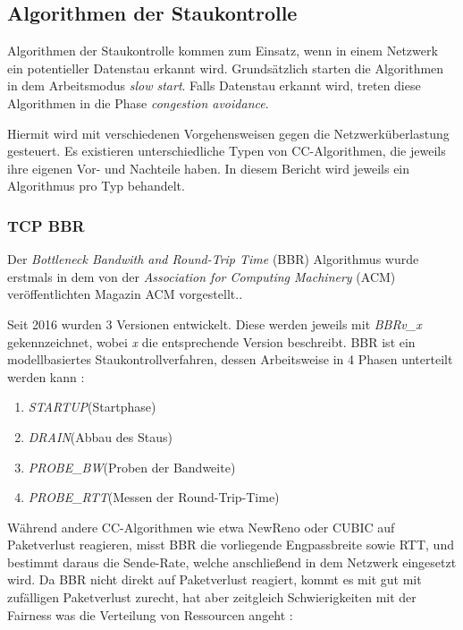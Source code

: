 \documentclass[paper=a4,fontsize=12pt,ngerman]{scrartcl}
\begin{document}
\subsection{Algorithmen der Staukontrolle }

Algorithmen der Staukontrolle kommen zum Einsatz, wenn in einem Netzwerk ein potentieller Datenstau erkannt wird.
Grundsätzlich starten die Algorithmen in dem Arbeitsmodus \textit{slow start}.
Falls Datenstau erkannt wird, treten diese Algorithmen in die Phase \textit{congestion avoidance}.


Hiermit wird mit verschiedenen Vorgehensweisen gegen die Netzwerküberlastung gesteuert. 
\newline
Es existieren unterschiedliche Typen von CC-Algorithmen, die jeweils ihre eigenen Vor- und Nachteile haben.
In diesem Bericht wird jeweils ein Algorithmus pro Typ behandelt.





\subsubsection{TCP BBR} 
Der \textit{Bottleneck Bandwith and Round-Trip Time} (BBR) Algorithmus wurde erstmals in dem von der
\textit{Association for Computing Machinery} (ACM) veröffentlichten Magazin ACM vorgestellt.\cite{cardwell2016bbr}. 

Seit 2016 wurden 3 Versionen entwickelt. Diese werden jeweils mit \textit{BBRv\_x} gekennzeichnet, 
wobei \textit{x} die entsprechende Version beschreibt. \newline
BBR ist ein modellbasiertes Staukontrollverfahren, dessen Arbeitsweise in 4 Phasen
unterteilt werden kann : \newline

\begin{enumerate}
    \item \textit{STARTUP}(Startphase)
    \item \textit{DRAIN}(Abbau des Staus)
    \item \textit{PROBE\_BW}(Proben der Bandweite)
    \item \textit{PROBE\_RTT}(Messen der Round-Trip-Time)
\end{enumerate}


Während andere CC-Algorithmen wie etwa NewReno oder CUBIC auf Paketverlust reagieren, misst BBR die vorliegende Engpassbreite sowie RTT,
und bestimmt daraus die Sende-Rate, welche anschließend in dem Netzwerk eingesetzt wird. 
Da BBR nicht direkt auf Paketverlust reagiert, kommt es mit gut mit zufälligen Paketverlust zurecht, hat aber zeitgleich
Schwierigkeiten mit der Fairness was die Verteilung von Ressourcen angeht : 
\end{document}
